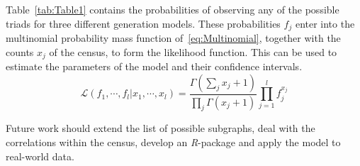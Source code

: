 \documentclass[conference]{IEEEtran}
\begin{document}
Table~\ref{tab:Table1} contains the probabilities of observing any of the possible triads for three different generation models. These probabilities $f_{j}$ enter into the multinomial probability mass function of~\eqref{eq:Multinomial}, together with the counts $x_{j}$ of the census, to form the likelihood function. This can be used to estimate the parameters of the model and their confidence intervals.
\begin{equation}
\mathcal{L}(f_{1}, \cdots, f_{l} | x_{1}, \cdots, x_{l}) = \frac{\Gamma(\sum_{j} x_{j}+1)}{\prod_{j} \Gamma(x_{j}+1)} \prod_{j=1}^{l} f_{j}^{x_{j}}
\label{eq:Multinomial}
\end{equation}

Future work should extend the list of possible subgraphs, deal with the correlations within the census, develop an \mbox{\textit{R}-package} and apply the model to real-world data.

\newpage


\end{document}
